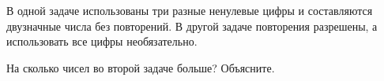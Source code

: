\begin{checkpointbox}
  В одной задаче использованы три разные ненулевые цифры и составляются
  двузначные числа без повторений. В другой задаче повторения разрешены, а
  использовать все цифры необязательно.

  На сколько чисел во второй задаче больше? Объясните.
\end{checkpointbox}
